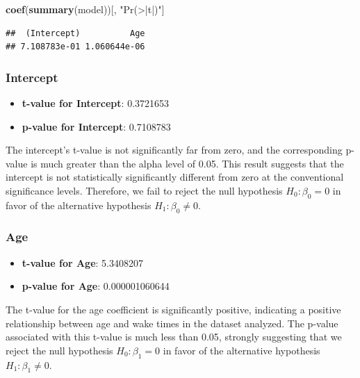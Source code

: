 \documentclass[
]{article}
\newenvironment{Shaded}{\begin{snugshade}}{\end{snugshade}}
\newcommand{\FunctionTok}[1]{\textcolor[rgb]{0.13,0.29,0.53}{\textbf{#1}}}
\newcommand{\NormalTok}[1]{#1}
\newcommand{\StringTok}[1]{\textcolor[rgb]{0.31,0.60,0.02}{#1}}
\providecommand{\tightlist}{%
  \setlength{\itemsep}{0pt}\setlength{\parskip}{0pt}}
\begin{document}
\begin{Shaded}
\begin{Highlighting}[]
\FunctionTok{coef}\NormalTok{(}\FunctionTok{summary}\NormalTok{(model))[, }\StringTok{"Pr(\textgreater{}|t|)"}\NormalTok{]}
\end{Highlighting}
\end{Shaded}

\begin{verbatim}
##  (Intercept)          Age 
## 7.108783e-01 1.060644e-06
\end{verbatim}

\hypertarget{intercept-1}{%
\subsubsection{Intercept}\label{intercept-1}}

\begin{itemize}
\tightlist
\item
  \textbf{t-value for Intercept}: 0.3721653
\item
  \textbf{p-value for Intercept}: 0.7108783
\end{itemize}

The intercept's t-value is not significantly far from zero, and the
corresponding p-value is much greater than the alpha level of 0.05. This
result suggests that the intercept is not statistically significantly
different from zero at the conventional significance levels. Therefore,
we fail to reject the null hypothesis \(H_0: \beta_{0} = 0\) in favor of
the alternative hypothesis \(H_1: \beta_{0} \neq 0\).

\hypertarget{age}{%
\subsubsection{Age}\label{age}}

\begin{itemize}
\tightlist
\item
  \textbf{t-value for Age}: 5.3408207
\item
  \textbf{p-value for Age}: 0.000001060644
\end{itemize}

The t-value for the age coefficient is significantly positive,
indicating a positive relationship between age and wake times in the
dataset analyzed. The p-value associated with this t-value is much less
than 0.05, strongly suggesting that we reject the null hypothesis
\(H_0: \beta_{1} = 0\) in favor of the alternative hypothesis
\(H_1: \beta_{1} \neq 0\).
\end{document}
